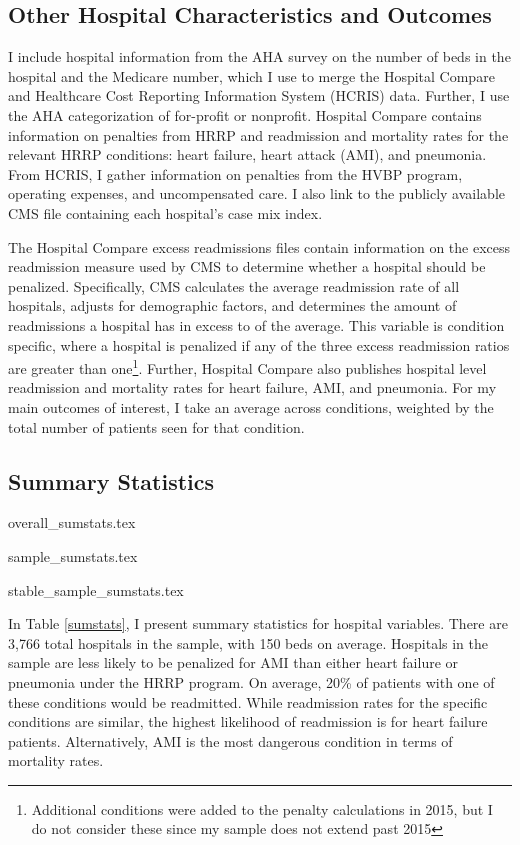 \documentclass[12pt]{article}
\begin{document}
    \subsection{Other Hospital Characteristics and Outcomes}

    I include hospital information from the AHA survey on the number of beds in the hospital and the Medicare number, which I use to merge the Hospital Compare and Healthcare Cost Reporting Information System (HCRIS) data. Further, I use the AHA categorization of for-profit or nonprofit. Hospital Compare contains information on penalties from HRRP and readmission and mortality rates for the relevant HRRP conditions: heart failure, heart attack (AMI), and pneumonia. From HCRIS, I gather information on penalties from the HVBP program, operating expenses, and uncompensated care. I also link to the publicly available CMS file containing each hospital's case mix index.

    The Hospital Compare excess readmissions files contain information on the excess readmission measure used by CMS to determine whether a hospital should be penalized. Specifically, CMS calculates the average readmission rate of all hospitals, adjusts for demographic factors, and determines the amount of readmissions a hospital has in excess to of the average. This variable is condition specific, where a hospital is penalized if any of the three excess readmission ratios are greater than one\footnote{Additional conditions were added to the penalty calculations in 2015, but I do not consider these since my sample does not extend past 2015}. Further, Hospital Compare also publishes hospital level readmission and mortality rates for heart failure, AMI, and pneumonia. For my main outcomes of interest, I take an average across conditions, weighted by the total number of patients seen for that condition.

    \subsection{Summary Statistics}

    {overall_sumstats.tex}

    {sample_sumstats.tex}

    {stable_sample_sumstats.tex}

    In Table \ref{sumstats}, I present summary statistics for hospital variables. There are 3,766 total hospitals in the sample, with 150 beds on average. Hospitals in the sample are less likely to be penalized for AMI than either heart failure or pneumonia under the HRRP program. On average, 20\% of patients with one of these conditions would be readmitted. While readmission rates for the specific conditions are similar, the highest likelihood of readmission is for heart failure patients. Alternatively, AMI is the most dangerous condition in terms of mortality rates. 
\end{document}
